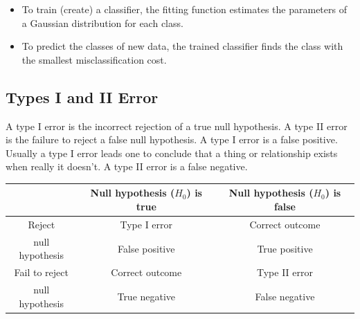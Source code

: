 \documentclass[]{report}
\begin{document}

\begin{itemize}
\item To train (create) a classifier, the fitting function estimates the parameters of a Gaussian distribution for each class.
\item To predict the classes of new data, the trained classifier finds the class with the smallest misclassification cost.
\end{itemize}
%



\subsection{Types I and II Error}
A type I error is the incorrect rejection of a true null hypothesis.
A type II error is the failure to reject a false null hypothesis.
A type I error is a false positive. Usually a type I error leads one to conclude that a thing
or relationship exists when really it doesn't.
A type II error is a false negative.
\begin{tabular}{|c|c|c|}
  \hline

& Null hypothesis ($H_0$) is true	& Null hypothesis ($H_0$) is false\\ \hline
Reject  & Type I error          & Correct outcome \\
null hypothesis 			& False positive	& True positive\\ \hline
Fail to reject 	&Correct outcome&Type II error\\
null hypothesis & True negative	& False negative\\
  \hline
\end{tabular}
\end{document}
